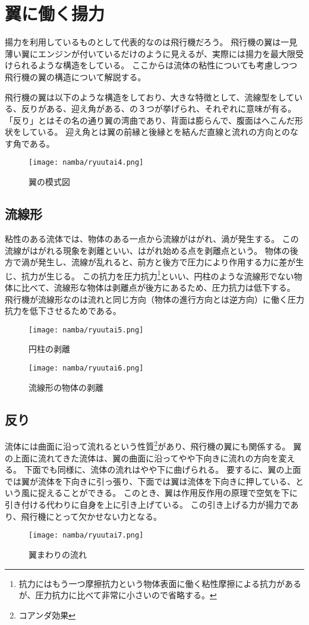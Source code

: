 \documentclass[10pt,b5paper,papersize,dvipdfmx]{jsbook}
\begin{document}
\section{翼に働く揚力}
揚力を利用しているものとして代表的なのは飛行機だろう。
飛行機の翼は一見薄い翼にエンジンが付いているだけのように見えるが、実際には揚力を最大限受けられるような構造をしている。
ここからは流体の粘性についても考慮しつつ飛行機の翼の構造について解説する。
\par
飛行機の翼は以下のような構造をしており、大きな特徴として、流線型をしている、反りがある、迎え角がある、の３つが挙げられ、それぞれに意味が有る。
「反り」とはその名の通り翼の湾曲であり、背面は膨らんで、腹面はへこんだ形状をしている。
迎え角とは翼の前縁と後縁とを結んだ直線と流れの方向とのなす角である。
\begin{figure}[ht]
  \centering
  \texttt{[image: namba/ryuutai4.png]}
  \caption{翼の模式図}
\end{figure}
\subsection{流線形}
粘性のある流体では、物体のある一点から流線がはがれ、渦が発生する。
この流線がはがれる現象を剥離といい、はがれ始める点を剥離点という。
物体の後方で渦が発生し、流線が乱れると、前方と後方で圧力により作用する力に差が生じ、抗力が生じる。
この抗力を圧力抗力\footnote{抗力にはもう一つ摩擦抗力という物体表面に働く粘性摩擦による抗力があるが、圧力抗力に比べて非常に小さいので省略する。}といい、円柱のような流線形でない物体に比べて、流線形な物体は剥離点が後方にあるため、圧力抗力は低下する。
飛行機が流線形なのは流れと同じ方向（物体の進行方向とは逆方向）に働く圧力抗力を低下させるためである。
\begin{figure}[ht]
  \centering
  \texttt{[image: namba/ryuutai5.png]}
  \caption{円柱の剥離}
  \centering
  \texttt{[image: namba/ryuutai6.png]}
  \caption{流線形の物体の剥離}
\end{figure}
\subsection{反り}
流体には曲面に沿って流れるという性質\footnote{コアンダ効果}があり、飛行機の翼にも関係する。
翼の上面に流れてきた流体は、翼の曲面に沿ってやや下向きに流れの方向を変える。
下面でも同様に、流体の流れはやや下に曲げられる。
要するに、翼の上面では翼が流体を下向きに引っ張り、下面では翼は流体を下向きに押している、という風に捉えることができる。
このとき、翼は作用反作用の原理で空気を下に引き付ける代わりに自身を上に引き上げている。
この引き上げる力が揚力であり、飛行機にとって欠かせない力となる。
\begin{figure}[ht]
  \centering
  \texttt{[image: namba/ryuutai7.png]}
  \caption{翼まわりの流れ}
\end{figure}
\end{document}
